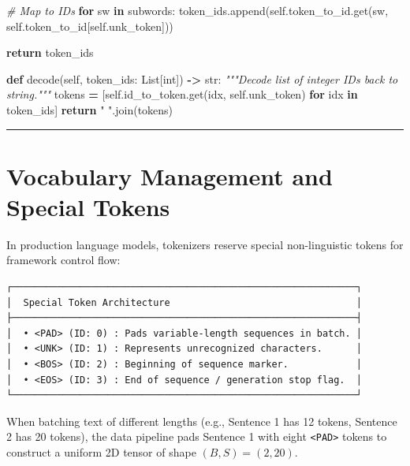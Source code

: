 \documentclass[
  letterpaper,
]{scrbook}
\newenvironment{Shaded}{\begin{snugshade}}{\end{snugshade}}
\newcommand{\BuiltInTok}[1]{#1}
\newcommand{\CommentTok}[1]{\textcolor[rgb]{0.56,0.35,0.01}{\textit{#1}}}
\newcommand{\ControlFlowTok}[1]{\textcolor[rgb]{0.13,0.29,0.53}{\textbf{#1}}}
\newcommand{\KeywordTok}[1]{\textcolor[rgb]{0.13,0.29,0.53}{\textbf{#1}}}
\newcommand{\NormalTok}[1]{#1}
\newcommand{\OperatorTok}[1]{\textcolor[rgb]{0.81,0.36,0.00}{\textbf{#1}}}
\newcommand{\StringTok}[1]{\textcolor[rgb]{0.31,0.60,0.02}{#1}}
\newcommand{\VariableTok}[1]{\textcolor[rgb]{0.00,0.00,0.00}{#1}}
\begin{document}
\begin{Shaded}
\begin{Highlighting}[]
            \CommentTok{\# Map to IDs}
            \ControlFlowTok{for}\NormalTok{ sw }\KeywordTok{in}\NormalTok{ subwords:}
\NormalTok{                token\_ids.append(}\VariableTok{self}\NormalTok{.token\_to\_id.get(sw, }\VariableTok{self}\NormalTok{.token\_to\_id[}\VariableTok{self}\NormalTok{.unk\_token]))}

        \ControlFlowTok{return}\NormalTok{ token\_ids}

    \KeywordTok{def}\NormalTok{ decode(}\VariableTok{self}\NormalTok{, token\_ids: List[}\BuiltInTok{int}\NormalTok{]) }\OperatorTok{{-}\textgreater{}} \BuiltInTok{str}\NormalTok{:}
        \CommentTok{"""Decode list of integer IDs back to string."""}
\NormalTok{        tokens }\OperatorTok{=}\NormalTok{ [}\VariableTok{self}\NormalTok{.id\_to\_token.get(idx, }\VariableTok{self}\NormalTok{.unk\_token) }\ControlFlowTok{for}\NormalTok{ idx }\KeywordTok{in}\NormalTok{ token\_ids]}
        \ControlFlowTok{return} \StringTok{" "}\NormalTok{.join(tokens)}
\end{Highlighting}
\end{Shaded}

\begin{center}\rule{0.5\linewidth}{0.5pt}\end{center}

\section{Vocabulary Management and Special
Tokens}\label{vocabulary-management-and-special-tokens}

In production language models, tokenizers reserve special non-linguistic
tokens for framework control flow:

\begin{verbatim}
┌─────────────────────────────────────────────────────────────┐
│  Special Token Architecture                                 │
├─────────────────────────────────────────────────────────────┤
│  • <PAD> (ID: 0) : Pads variable-length sequences in batch. │
│  • <UNK> (ID: 1) : Represents unrecognized characters.      │
│  • <BOS> (ID: 2) : Beginning of sequence marker.            │
│  • <EOS> (ID: 3) : End of sequence / generation stop flag.  │
└─────────────────────────────────────────────────────────────┘
\end{verbatim}

When batching text of different lengths (e.g., Sentence 1 has 12 tokens,
Sentence 2 has 20 tokens), the data pipeline pads Sentence 1 with eight
\texttt{\textless{}PAD\textgreater{}} tokens to construct a uniform 2D
tensor of shape \((B, S) = (2, 20)\).
\end{document}
